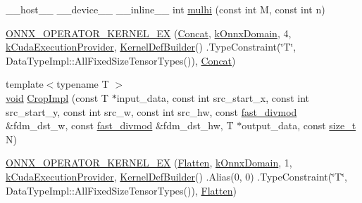 \begin{DoxyCompactItemize}
\item 
\+\_\+\+\_\+host\+\_\+\+\_\+ \+\_\+\+\_\+device\+\_\+\+\_\+ \+\_\+\+\_\+inline\+\_\+\+\_\+ int \mbox{\hyperlink{namespaceonnxruntime_1_1cuda_a22b8733c4c436accb3315fd80dea8932}{mulhi}} (const int M, const int n)
\item 
\mbox{\hyperlink{namespaceonnxruntime_1_1cuda_acd55fa00e3d78beba088900cd5e60b02}{O\+N\+N\+X\+\_\+\+O\+P\+E\+R\+A\+T\+O\+R\+\_\+\+K\+E\+R\+N\+E\+L\+\_\+\+EX}} (\mbox{\hyperlink{classonnxruntime_1_1cuda_1_1Concat}{Concat}}, \mbox{\hyperlink{namespaceonnxruntime_ac0e7c0c106a2c9e9594560a3ab289fa0}{k\+Onnx\+Domain}}, 4, \mbox{\hyperlink{namespaceonnxruntime_a73ebc64887ddd1968e3cef47ffefe35b}{k\+Cuda\+Execution\+Provider}}, \mbox{\hyperlink{classonnxruntime_1_1KernelDefBuilder}{Kernel\+Def\+Builder}}() .Type\+Constraint(\char`\"{}T\char`\"{}, Data\+Type\+Impl\+::\+All\+Fixed\+Size\+Tensor\+Types()), \mbox{\hyperlink{classonnxruntime_1_1cuda_1_1Concat}{Concat}})
\item 
{\footnotesize template$<$typename T $>$ }\\\mbox{\hyperlink{mlasi_8h_a88f941d423cb2a819b70a1358982b1a6}{void}} \mbox{\hyperlink{namespaceonnxruntime_1_1cuda_a3329fe7e028acb06f43ca214ea317902}{Crop\+Impl}} (const T $\ast$input\+\_\+data, const int src\+\_\+start\+\_\+x, const int src\+\_\+start\+\_\+y, const int src\+\_\+w, const int src\+\_\+hw, const \mbox{\hyperlink{classonnxruntime_1_1cuda_1_1fast__divmod}{fast\+\_\+divmod}} \&fdm\+\_\+dst\+\_\+w, const \mbox{\hyperlink{classonnxruntime_1_1cuda_1_1fast__divmod}{fast\+\_\+divmod}} \&fdm\+\_\+dst\+\_\+hw, T $\ast$output\+\_\+data, const \mbox{\hyperlink{mlasi_8h_a503efbc1c6e50825320ad909366b78ab}{size\+\_\+t}} N)
\item 
\mbox{\hyperlink{namespaceonnxruntime_1_1cuda_a105d360d973327e6e9711b8b2aca7460}{O\+N\+N\+X\+\_\+\+O\+P\+E\+R\+A\+T\+O\+R\+\_\+\+K\+E\+R\+N\+E\+L\+\_\+\+EX}} (\mbox{\hyperlink{classonnxruntime_1_1cuda_1_1Flatten}{Flatten}}, \mbox{\hyperlink{namespaceonnxruntime_ac0e7c0c106a2c9e9594560a3ab289fa0}{k\+Onnx\+Domain}}, 1, \mbox{\hyperlink{namespaceonnxruntime_a73ebc64887ddd1968e3cef47ffefe35b}{k\+Cuda\+Execution\+Provider}}, \mbox{\hyperlink{classonnxruntime_1_1KernelDefBuilder}{Kernel\+Def\+Builder}}() .Alias(0, 0) .Type\+Constraint(\char`\"{}T\char`\"{}, Data\+Type\+Impl\+::\+All\+Fixed\+Size\+Tensor\+Types()), \mbox{\hyperlink{classonnxruntime_1_1cuda_1_1Flatten}{Flatten}})
\item 

\end{DoxyCompactItemize}
